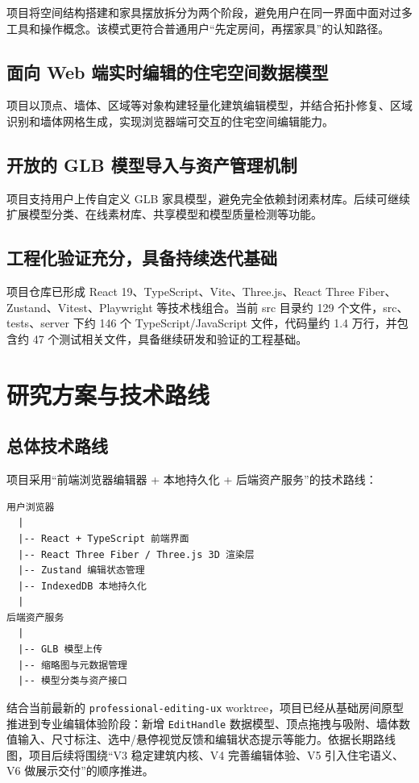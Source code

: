 \documentclass[UTF8,fontset=fandol,zihao=-4]{ctexart}
\begin{document}
项目将空间结构搭建和家具摆放拆分为两个阶段，避免用户在同一界面中面对过多工具和操作概念。该模式更符合普通用户“先定房间，再摆家具”的认知路径。

\subsection{面向 Web 端实时编辑的住宅空间数据模型}

项目以顶点、墙体、区域等对象构建轻量化建筑编辑模型，并结合拓扑修复、区域识别和墙体网格生成，实现浏览器端可交互的住宅空间编辑能力。

\subsection{开放的 GLB 模型导入与资产管理机制}

项目支持用户上传自定义 GLB 家具模型，避免完全依赖封闭素材库。后续可继续扩展模型分类、在线素材库、共享模型和模型质量检测等功能。

\subsection{工程化验证充分，具备持续迭代基础}

项目仓库已形成 React 19、TypeScript、Vite、Three.js、React Three Fiber、Zustand、Vitest、Playwright 等技术栈组合。当前 src 目录约 129 个文件，src、tests、server 下约 146 个 TypeScript/JavaScript 文件，代码量约 1.4 万行，并包含约 47 个测试相关文件，具备继续研发和验证的工程基础。

\section{研究方案与技术路线}

\subsection{总体技术路线}

项目采用“前端浏览器编辑器 + 本地持久化 + 后端资产服务”的技术路线：

\begin{lstlisting}
用户浏览器
  |
  |-- React + TypeScript 前端界面
  |-- React Three Fiber / Three.js 3D 渲染层
  |-- Zustand 编辑状态管理
  |-- IndexedDB 本地持久化
  |
后端资产服务
  |
  |-- GLB 模型上传
  |-- 缩略图与元数据管理
  |-- 模型分类与资产接口
\end{lstlisting}

结合当前最新的 \texttt{professional-editing-ux} worktree，项目已经从基础房间原型推进到专业编辑体验阶段：新增 \texttt{EditHandle} 数据模型、顶点拖拽与吸附、墙体数值输入、尺寸标注、选中/悬停视觉反馈和编辑状态提示等能力。依据长期路线图，项目后续将围绕“V3 稳定建筑内核、V4 完善编辑体验、V5 引入住宅语义、V6 做展示交付”的顺序推进。
\end{document}
